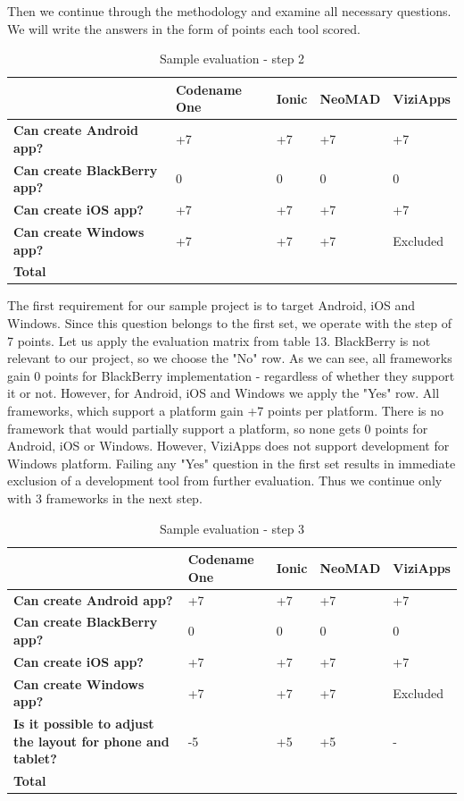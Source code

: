 \documentclass[english,master,public,dept460,male,cpdeclaration,oneside]{diploma}
\begin{document}
Then we continue through the methodology and examine all necessary questions. We will write the answers in the form of points each tool scored.

\begin{table}[!h]
	\centering
	\caption{Sample evaluation - step 2}
	\begin{tabular}{p{2.5cm} | p{2.5cm} | p{2.5cm} | p{2.5cm} | p{2.5cm}}
		\toprule
		& \textbf{Codename One} & \textbf{Ionic} & \textbf{NeoMAD} & \textbf{ViziApps} \\
		\midrule
		\textbf{Can create Android app?} & +7 & +7 & +7 & +7 \\
		\textbf{Can create BlackBerry app?} & 0 & 0 & 0 & 0 \\
		\textbf{Can create iOS app?} & +7 & +7 & +7 & +7 \\
		\textbf{Can create Windows app?} & +7 & +7 & +7 & Excluded \\
		\midrule
		\textbf{Total} &&&& \\
		\midrule
	\end{tabular}
\end{table}

The first requirement for our sample project is to target Android, iOS and Windows. Since this question belongs to the first set, we operate with the step of 7 points. Let us apply the evaluation matrix from table 13. BlackBerry is not relevant to our project, so we choose the "No" row. As we can see, all frameworks gain 0 points for BlackBerry implementation - regardless of whether they support it or not. However, for Android, iOS and Windows we apply the "Yes" row. All frameworks, which support a platform gain +7 points per platform. There is no framework that would partially support a platform, so none gets 0 points for Android, iOS or Windows. However, ViziApps does not support development for Windows platform. Failing any "Yes" question in the first set results in immediate exclusion of a development tool from further evaluation. Thus we continue only with 3 frameworks in the next step.

\begin{table}[!h]
	\centering
	\caption{Sample evaluation - step 3}
	\begin{tabular}{p{2.5cm} | p{2.5cm} | p{2.5cm} | p{2.5cm} | p{2.5cm}}
		\toprule
		& \textbf{Codename One} & \textbf{Ionic} & \textbf{NeoMAD} & \textbf{ViziApps} \\
		\midrule
		\textbf{Can create Android app?} & +7 & +7 & +7 & +7 \\
		\textbf{Can create BlackBerry app?} & 0 & 0 & 0 & 0 \\
		\textbf{Can create iOS app?} & +7 & +7 & +7 & +7 \\
		\textbf{Can create Windows app?} & +7 & +7 & +7 & Excluded \\
		\midrule
		\textbf{Is it possible to adjust the layout for phone and tablet?} & -5 & +5 & +5 & - \\
		\midrule
		\textbf{Total} &&&& \\
		\midrule
	\end{tabular}
\end{table}
\end{document}
